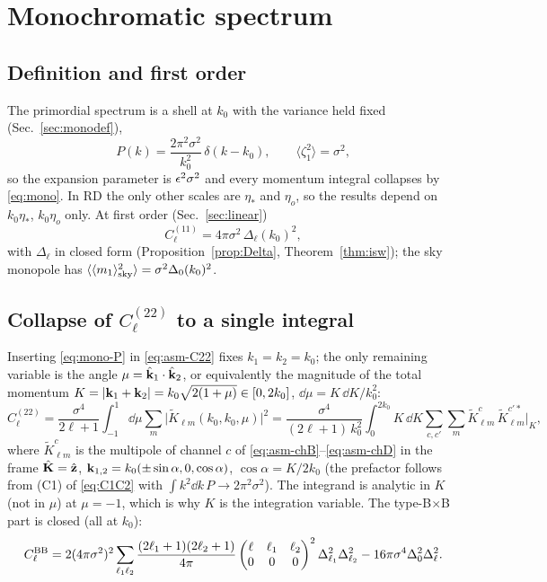 \section{Monochromatic spectrum}
\label{sec:mono}
\subsection{Definition and first order}
\label{sec:mono-def}
The primordial spectrum is a shell at $k_0$ with the variance held fixed (Sec.~\ref{sec:monodef}),
\begin{equation}
P(k)=\frac{2\pi^2\sigma^2}{k_0^2}\,\delta(k-k_0),\qquad \langle\zeta_1^2\rangle=\sigma^2,
\label{eq:mono-P}
\end{equation}
so the expansion parameter is $\epsilon^2\sigma^2$ and every momentum integral collapses by \eqref{eq:mono}.  In RD the only other scales
are $\eta_*$ and $\eta_o$, so the results depend on $k_0\eta_*$, $k_0\eta_o$ only.  At first order (Sec.~\ref{sec:linear})
\begin{equation}
C^{(11)}_\ell=4\pi\sigma^2\,\Delta_\ell(k_0)^2,
\label{eq:mono-C11}
\end{equation}
with $\Delta_\ell$ in closed form (Proposition~\ref{prop:Delta}, Theorem~\ref{thm:isw}); the sky monopole has
$\langle\langle m_1\rangle_{\rm sky}^2\rangle=\sigma^2\Delta_0(k_0)^2$.

\subsection{Collapse of \texorpdfstring{$C^{(22)}_\ell$}{C22} to a single integral}
\label{sec:mono-C22}
Inserting \eqref{eq:mono-P} in \eqref{eq:asm-C22} fixes $k_1=k_2=k_0$; the only remaining variable is the angle
$\mu=\hat{\mathbf k}_1\cdot\hat{\mathbf k}_2$, or equivalently the magnitude of the total momentum $K=|\mathbf k_1+\mathbf k_2|=k_0\sqrt{2(1+\mu)}\in[0,2k_0]$,
$\dd\mu=K\,\dd K/k_0^2$:
\begin{equation}
C^{(22)}_\ell=\frac{\sigma^4}{2\ell+1}\int_{-1}^{1}\!\dd\mu\sum_m\big|\tilde K_{\ell m}(k_0,k_0,\mu)\big|^2
=\frac{\sigma^4}{(2\ell+1)\,k_0^2}\int_0^{2k_0}\!K\,\dd K\sum_{c,c'}\sum_m\tilde K^c_{\ell m}\,\tilde K^{c'*}_{\ell m}\Big|_{K},
\label{eq:mono-C22}
\end{equation}
where $\tilde K^c_{\ell m}$ is the multipole of channel $c$ of \eqref{eq:asm-chB}--\eqref{eq:asm-chD} in the frame $\hat{\mathbf K}=\hat{\mathbf z}$,
$\mathbf k_{1,2}=k_0(\pm\sin\alpha,0,\cos\alpha)$, $\cos\alpha=K/2k_0$ (the prefactor follows from (C1) of \eqref{eq:C1C2} with
$\int k^2\dd k\,P\to2\pi^2\sigma^2$).  The integrand is analytic in $K$ (not in $\mu$) at $\mu=-1$, which is why $K$ is the integration
variable.  The type-B$\times$B part is closed (all at $k_0$):
\begin{equation}
C^{\rm BB}_\ell=2(4\pi\sigma^2)^2\sum_{\ell_1\ell_2}\frac{(2\ell_1+1)(2\ell_2+1)}{4\pi}\begin{pmatrix}\ell&\ell_1&\ell_2\\0&0&0\end{pmatrix}^2\Delta_{\ell_1}^2\Delta_{\ell_2}^2
-16\pi\sigma^4\Delta_0^2\Delta_\ell^2 .
\label{eq:mono-BB}
\end{equation}

